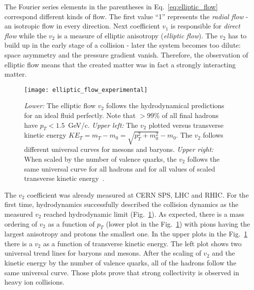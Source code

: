         The Fourier series elements in the parentheses in Eq.~\ref{eq:elliptic_flow} correspond different kinds of flow.
        The first value ``1'' represents the \textit{radial flow} - an isotropic flow in every direction.
        Next coefficient $v_1$ is responsible for \textit{direct flow} while the $v_2$ is a measure of elliptic anisotropy (\textit{elliptic flow}).
        The $v_2$ has to build up in the early stage of a collision - later the system becomes too dilute: space asymmetry and the pressure gradient vanish.
        Therefore, the observation of elliptic flow means that the created matter was in fact a strongly interacting matter.
        \begin{figure}[h]
          \centering
          \texttt{[image: elliptic\_flow\_experimental]}
          \caption{\textit{Lower:} The elliptic flow $v_2$ follows the hydrodynamical predictions for an ideal fluid perfectly. Note that $> 99\%$ of all final hadrons have $p_T < 1.5$~GeV/c. \textit{Upper left:} The $v_2$ plotted versus transverse kinetic energy $KE_T = m_T - m_0 = \sqrt{p_T^2 + m_0^2} - m_0$. The $v_2$ follows different universal curves for mesons and baryons. \textit{Upper right:} When scaled by the number of valence quarks, the $v_2$ follows the same universal curve for all hadrons and for all values of scaled transverse kinetic energy~\cite{heinz}.}
          \label{fig:elliptic_flow_experimental}
        \end{figure}

        The $v_2$ coefficient was already measured at CERN SPS, LHC and RHIC.
        For the first time, hydrodynamics successfully described the collision dynamics as the measured $v_2$ reached hydrodynamic limit (Fig.~\ref{fig:elliptic_flow_experimental}).
        As expected, there is a mass ordering of $v_2$ as a function of $p_T$ (lower plot in the Fig.~\ref{fig:elliptic_flow_experimental}) with pions having the largest anisotropy and protons the smallest one.
        In the upper plots in the Fig.~\ref{fig:elliptic_flow_experimental} there is a $v_2$ as a function of transverse kinetic energy.
        The left plot shows two universal trend lines for baryons and mesons.
        After the scaling of $v_2$ and the kinetic energy by the number of valence quarks, all of the hadrons follow the same universal curve.
        Those plots prove that strong collectivity is observed in heavy ion collisions.

      \FloatBarrier
